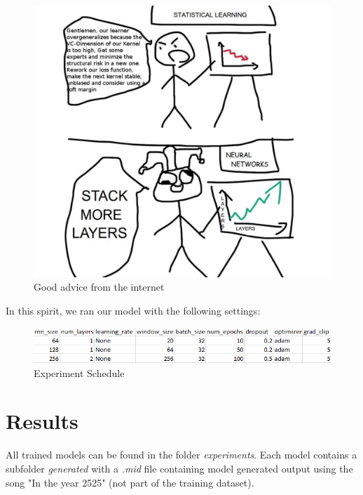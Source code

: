 \documentclass{article}
\begin{document}
\begin{figure}[h]
    \centering
    \includegraphics[scale=0.25]{stack_more_layers.png}
    \caption{Good advice from the internet}
    \label{fig:good_advice}
\end{figure}

In this spirit, we ran our model with the following settings:
\begin{figure}[h]
    \centering
    \includegraphics[scale=0.8]{experiment_schedule_2.png}
    \caption{Experiment Schedule}
    \label{fig:experiment_schedule1}
\end{figure}

\section{Results}
All trained models can be found in the folder \textit{experiments}. Each model contains a subfolder \textit{generated} with a \textit{.mid} file containing model generated output using the song "In the year 2525" (not part of the training dataset).
\end{document}
